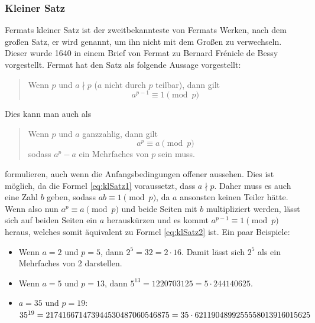\subsubsection{Kleiner Satz} \label{sec:klSatz}
Fermats kleiner Satz ist der zweitbekannteste von Fermats Werken, nach dem großen Satz, er wird  genannt, um ihn nicht mit dem Großen zu verwechseln. Dieser wurde 1640 in einem Brief von Fermat zu Bernard Frénicle de Bessy vorgestellt. Fermat hat den Satz als folgende Aussage vorgestellt:

\begin{quote}
    Wenn $p$  und $a \nmid p$ ($a$ nicht durch $p$ teilbar), dann gilt
    \begin{equation} \label{eq:klSatz1}
        a^{p-1} \equiv 1 \pmod{p}
    \end{equation}
\end{quote}

\noindent Dies kann man auch als

\begin{quote}
    Wenn $p$  und $a$ ganzzahlig, dann gilt
    \begin{equation} \label{eq:klSatz2}
        a^p \equiv a \pmod{p}
    \end{equation}
    sodass $a^p - a$ ein Mehrfaches von $p$ sein muss.
\end{quote}

\noindent formulieren, auch wenn die Anfangsbedingungen offener aussehen. Dies ist möglich, da die Formel \ref{eq:klSatz1} voraussetzt, dass $a \nmid p$. Daher muss es auch eine Zahl $b$ geben, sodass $ab \equiv 1 \pmod{p}$, da $a$ ansonsten keinen Teiler hätte. Wenn also nun $a^p \equiv a \pmod{p}$ und beide Seiten mit $b$ multipliziert werden, lässt sich auf beiden Seiten ein $a$ herauskürzen und es kommt $a^{p-1} \equiv 1 \pmod{p}$ heraus, welches somit äquivalent zu Formel \ref{eq:klSatz2} ist. Ein paar Beispiele:

\begin{itemize}
    \item Wenn $a=2$ und $p=5$, dann $2^{5} = 32 = 2 \cdot 16$. Damit lässt sich $2^{5}$ als ein Mehrfaches von 2 darstellen.
    \item Wenn $a=5$ und $p=13$, dann $5^{13} = 1220703125 = 5 \cdot 244140625$.
    \item $a=35$ und $p=19$: \quad $35^{19} = 217416671473944530487060546875 \\ = 35 \cdot 6211904899255558013916015625$
\end{itemize}

